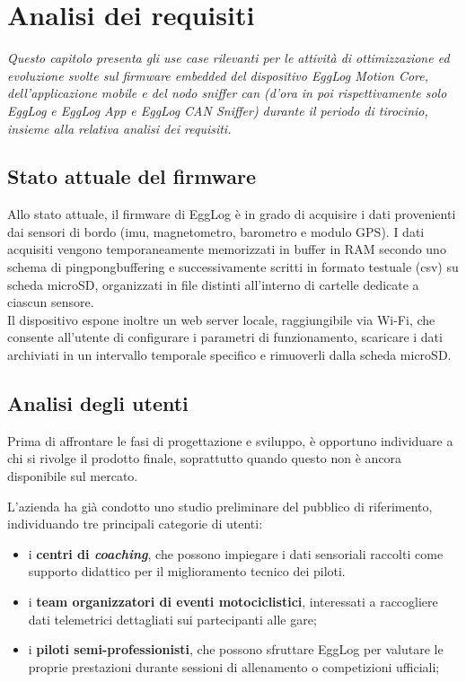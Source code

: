 \chapter{Analisi dei requisiti}
\label{chap:analisi-requisiti}

\textit{Questo capitolo presenta gli use case rilevanti per le attività di ottimizzazione ed evoluzione 
svolte sul firmware embedded del dispositivo EggLog Motion Core, dell'applicazione mobile e del nodo sniffer 
can (d'ora in poi rispettivamente solo EggLog e EggLog App e EggLog CAN Sniffer) durante il periodo di tirocinio, 
insieme alla relativa analisi dei requisiti.}

\section{Stato attuale del firmware}
Allo stato attuale, il firmware di EggLog è in grado di acquisire i dati provenienti dai sensori di bordo 
(\gls{imu}, magnetometro, barometro e modulo GPS). 
I dati acquisiti vengono temporaneamente memorizzati in buffer in RAM secondo uno schema di \gls{pingpongbuffering} 
e successivamente scritti in formato testuale (\gls{csv}) su scheda microSD, organizzati in file 
distinti all'interno di cartelle dedicate a ciascun sensore. 
\\
Il dispositivo espone inoltre un web server locale, raggiungibile via Wi-Fi, che consente all'utente di configurare i parametri di funzionamento, 
scaricare i dati archiviati in un intervallo temporale specifico e rimuoverli dalla scheda microSD.

\section{Analisi degli utenti}
Prima di affrontare le fasi di progettazione e sviluppo, è opportuno individuare a chi si rivolge il 
prodotto finale, soprattutto quando questo non è ancora disponibile sul mercato.

L'azienda ha già condotto uno studio preliminare del pubblico di riferimento, individuando tre principali 
categorie di utenti:
\begin{itemize}
    \item i \textbf{centri di \textit{coaching}}, che possono impiegare i dati sensoriali raccolti come supporto didattico 
    per il miglioramento tecnico dei piloti.
    \item i \textbf{team organizzatori di eventi motociclistici}, interessati a raccogliere dati telemetrici 
    dettagliati sui partecipanti alle gare;
    \item i \textbf{piloti semi-professionisti}, che possono sfruttare EggLog per valutare le proprie prestazioni 
    durante sessioni di allenamento o competizioni ufficiali;
\end{itemize}

